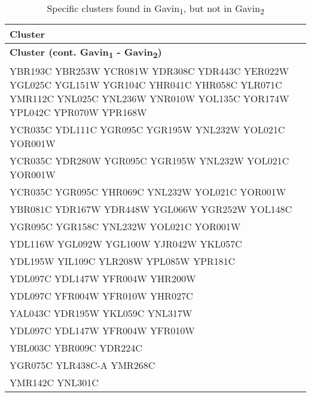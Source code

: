 \setlength{\extrarowheight}{2pt}
\renewcommand{\arraystretch}{1.2}
\begin{longtable}{| m{27em} |}
\caption{Specific clusters found in Gavin\textsubscript{1}, but not in Gavin\textsubscript{2}} \\
\hline
\textbf{Cluster} \\
\hline
\endfirsthead
\hline
\textbf{Cluster (cont. Gavin\textsubscript{1} - Gavin\textsubscript{2})} \\
\hline
\endhead
\hline
\endfoot
\hline
\endlastfoot
YBR193C YBR253W YCR081W YDR308C YDR443C YER022W YGL025C YGL151W YGR104C YHR041C YHR058C YLR071C YMR112C YNL025C YNL236W YNR010W YOL135C YOR174W YPL042C YPR070W YPR168W \\
\hline
YCR035C YDL111C YGR095C YGR195W YNL232W YOL021C YOR001W \\
\hline
YCR035C YDR280W YGR095C YGR195W YNL232W YOL021C YOR001W \\
\hline
YCR035C YGR095C YHR069C YNL232W YOL021C YOR001W \\
\hline
YBR081C YDR167W YDR448W YGL066W YGR252W YOL148C \\
\hline
YGR095C YGR158C YNL232W YOL021C YOR001W \\
\hline
YDL116W YGL092W YGL100W YJR042W YKL057C \\
\hline
YDL195W YIL109C YLR208W YPL085W YPR181C \\
\hline
YDL097C YDL147W YFR004W YHR200W \\
\hline
YDL097C YFR004W YFR010W YHR027C \\
\hline
YAL043C YDR195W YKL059C YNL317W \\
\hline
YDL097C YDL147W YFR004W YFR010W \\
\hline
YBL003C YBR009C YDR224C \\
\hline
YGR075C YLR438C-A YMR268C \\
\hline
YMR142C YNL301C \\
\hline
\end{longtable}